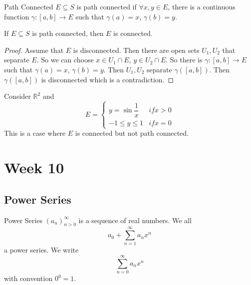 \documentclass{report}
\begin{document}
\begin{definition}{Path Connected}
    $E \subseteq S$ is path connected if $\forall x, y \in E$, there is a continuous function $\gamma : [a, b] \rightarrow E$ such that $\gamma(a) = x$, $\gamma(b) = y$.
\end{definition}

\begin{theorem}{22.5}
    If $E \subseteq S$ is path connected, then $E$ is connected.
\end{theorem}
    \begin{proof}
        Assume that $E$ is disconnected. Then there are open sets $U_{1}, U_{2}$ that separate $E$. So we can choose $x \in U_{1} \cap E$, $y \in U_{2} \cap E $. So there is $\gamma: [a, b] \rightarrow E$ such that $\gamma(a) = x$, $\gamma(b) = y$. Then $U_{1}, U_2$ separate $\gamma([a, b])$. Then $\gamma([a, b])$ is disconnected which is a contradiction.
    \end{proof}

\begin{examples}
    \begin{example}
        Consider $\mathbb{R}^{2}$ and 
            \begin{equation*}
                E = \begin{cases}
                    y = \sin{\dfrac{1}{x}} & if x > 0 \\
                    -1 \leq  y \leq 1 & if x = 0
                \end{cases}
            \end{equation*}
        This is a case where $E$ is connected but not path connected.
    \end{example}
\end{examples}

\chapter{Week 10}

\begin{topic}
    \section{Power Series}
\end{topic}

\begin{definition}{Power Series}
    $(a_{n})_{n >0}^{\infty}$ is a sequence of real numbers. We all
        \begin{equation*}
            a_{0} + \sum_{n = 1}^{\infty} a_{n}x^{n}
        \end{equation*}
    a power series. We write 
        \begin{equation*}
            \sum_{n = 0}^{\infty} a_{n}x^{n}
        \end{equation*}
    with convention $0^{0} = 1$.
\end{definition}
\end{document}
